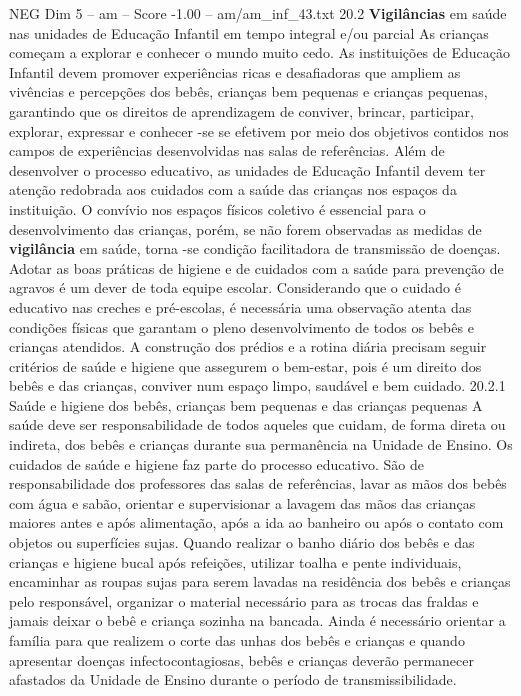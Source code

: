 \begin{textsample}{NEG Dim 5 – am – Score -1.00 – am/am\_inf\_43.txt}  \label{ex:f5_neg_224}
20.2 \textbf{Vigilâncias} em saúde nas unidades de Educação Infantil em tempo integral e/ou parcial As crianças começam a explorar e conhecer o mundo muito cedo.
As instituições de Educação Infantil devem promover experiências ricas e desafiadoras que ampliem as vivências e percepções dos bebês, crianças bem pequenas e crianças pequenas, garantindo que os direitos de aprendizagem de conviver, brincar, participar, explorar, expressar e conhecer -se se efetivem por meio dos objetivos contidos nos campos de experiências desenvolvidas nas salas de referências.
Além de desenvolver o processo educativo, as unidades de Educação Infantil devem ter atenção redobrada aos cuidados com a saúde das crianças nos espaços da instituição.
O convívio nos espaços físicos coletivo é essencial para o desenvolvimento das crianças, porém, se não forem observadas as medidas de \textbf{vigilância} em saúde, torna -se condição facilitadora de transmissão de doenças.
Adotar as boas práticas de higiene e de cuidados com a saúde para prevenção de agravos é um dever de toda equipe escolar.
Considerando que o cuidado é educativo nas creches e pré-escolas, é necessária uma observação atenta das condições físicas que garantam o pleno desenvolvimento de todos os bebês e crianças atendidos.
A construção dos prédios e a rotina diária precisam seguir critérios de saúde e higiene que assegurem o bem-estar, pois é um direito dos bebês e das crianças, conviver num espaço limpo, saudável e bem cuidado. 20.2.1 Saúde e higiene dos bebês, crianças bem pequenas e das crianças pequenas A saúde deve ser responsabilidade de todos aqueles que cuidam, de forma direta ou indireta, dos bebês e crianças durante sua permanência na Unidade de Ensino.
Os cuidados de saúde e higiene faz parte do processo educativo.
São de responsabilidade dos professores das salas de referências, lavar as mãos dos bebês com água e sabão, orientar e supervisionar a lavagem das mãos das crianças maiores antes e após alimentação, após a ida ao banheiro ou após o contato com objetos ou superfícies sujas.
Quando realizar o banho diário dos bebês e das crianças e higiene bucal após refeições, utilizar toalha e pente individuais, encaminhar as roupas sujas para serem lavadas na residência dos bebês e crianças pelo responsável, organizar o material necessário para as trocas das fraldas e jamais deixar o bebê e criança sozinha na bancada.
Ainda é necessário orientar a família para que realizem o corte das unhas dos bebês e crianças e quando apresentar doenças infectocontagiosas, bebês e crianças deverão permanecer afastados da Unidade de Ensino durante o período de transmissibilidade.

\end{textsample}
